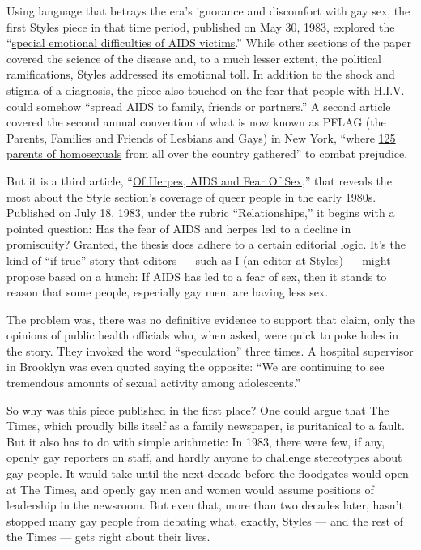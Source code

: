 Using language that betrays the era's ignorance and discomfort with gay
sex, the first Styles piece in that time period, published on May 30,
1983, explored the
``\href{https://www.nytimes.com/1983/05/30/style/facing-the-emotional-anguish-of-aids.html}{special
emotional difficulties of AIDS victims}.'' While other sections of the
paper covered the science of the disease and, to a much lesser extent,
the political ramifications, Styles addressed its emotional toll. In
addition to the shock and stigma of a diagnosis, the piece also touched
on the fear that people with H.I.V. could somehow ``spread AIDS to
family, friends or partners.'' A second article covered the second
annual convention of what is now known as PFLAG (the Parents, Families
and Friends of Lesbians and Gays) in New York, ``where
\href{https://www.nytimes.com/1983/10/10/style/for-homosexuals-parents-srength-in-community.html}{125
parents of homosexuals} from all over the country gathered'' to combat
prejudice.

But it is a third article,
``\href{https://www.nytimes.com/1983/07/18/style/relationships-of-herpes-aids-and-fear-of-sex.html}{Of
Herpes, AIDS and Fear Of Sex},'' that reveals the most about the Style
section's coverage of queer people in the early 1980s. Published on July
18, 1983, under the rubric ``Relationships,'' it begins with a pointed
question: Has the fear of AIDS and herpes led to a decline in
promiscuity? Granted, the thesis does adhere to a certain editorial
logic. It's the kind of ``if true'' story that editors --- such as I (an
editor at Styles) --- might propose based on a hunch: If AIDS has led to
a fear of sex, then it stands to reason that some people, especially gay
men, are having less sex.

The problem was, there was no definitive evidence to support that claim,
only the opinions of public health officials who, when asked, were quick
to poke holes in the story. They invoked the word ``speculation'' three
times. A hospital supervisor in Brooklyn was even quoted saying the
opposite: ``We are continuing to see tremendous amounts of sexual
activity among adolescents.''

So why was this piece published in the first place? One could argue that
The Times, which proudly bills itself as a family newspaper, is
puritanical to a fault. But it also has to do with simple arithmetic: In
1983, there were few, if any, openly gay reporters on staff, and hardly
anyone to challenge stereotypes about gay people. It would take until
the next decade before the floodgates would open at The Times, and
openly gay men and women would assume positions of leadership in the
newsroom. But even that, more than two decades later, hasn't stopped
many gay people from debating what, exactly, Styles --- and the rest of
the Times --- gets right about their lives.

